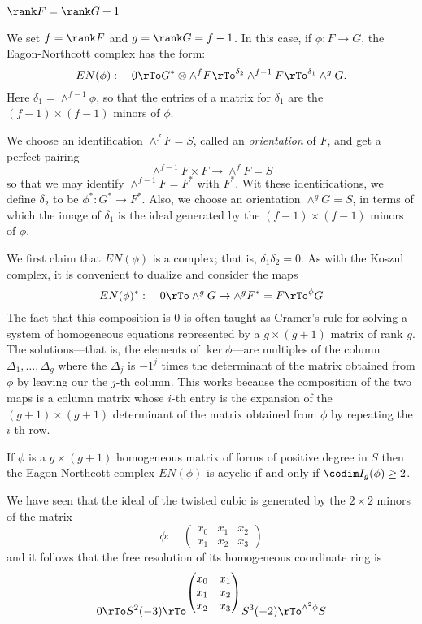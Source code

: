 \subsubsection{ $\rank F = \rank G + 1$}

We set $f = \rank F$ and $g=\rank G = f-1$. In this case, if $\phi:F\to G$, the Eagon-Northcott complex has the form:
$$
EN(\phi):\quad 0\rTo G^{*}\otimes \wedge^{f}F \rTo^{\delta_{2}} \wedge^{f-1}F \rTo^{\delta_{1}} \wedge^gG.
$$
Here $\delta_{1} = \wedge^{f-1}\phi$, so that the entries of a matrix for $\delta_{1}$ are the $(f-1)\times (f-1)$ minors of 
$\phi$.

We choose an identification $\wedge^{f}F = S$, called an \emph{orientation} of $F$, and get a perfect pairing 
$$
\wedge^{f-1}F \times F \to \wedge^{f}F = S
$$
so that we may identify
 $\wedge^{f-1}F = F^{*}$
 with $F^{*}$. Wit these identifications, we define $\delta_{2}$ to be  $\phi^{*}: G^{*}\to F^{*}$. Also,
 we choose an orientation $\wedge^{g}G = S$, in terms of which the image of $\delta_{1}$ is
 the ideal generated by the $(f-1)\times (f-1)$  minors of $\phi$.
 
We first claim that $EN(\phi)$ is a complex; that is,  $\delta_{1}\delta_{2} = 0$.  As with the Koszul complex,
it is convenient to dualize and consider the maps 
$$
EN(\phi)^{*}:\quad 0\rTo \wedge^{g} G \to \wedge^{g}F^{*} = F \rTo^{\phi} G
$$
The fact that this composition is 0 is often taught as Cramer's rule for solving a system of
homogeneous equations represented by a $g\times (g+1)$ matrix of rank $g$.
The solutions---that is, the elements of $\ker \phi$---are multiples of the column
$\Delta_{1}, \dots, \Delta_{g}$ where the $\Delta_{j}$ is $-1^{j}$ times the determinant
of the matrix obtained from $\phi$ by leaving our the $j$-th column. This works
because the composition of the two maps is a column matrix whose $i$-th entry is the
expansion of the $(g+1)\times (g+1)$ determinant of the matrix obtained from $\phi$ by
repeating the $i$-th row.

\begin{theorem}
If $\phi$ is a $g\times (g+1)$ homogeneous matrix of forms of positive degree in $S$ then the Eagon-Northcott
complex $EN(\phi)$ is acyclic if and only if $\codim I_{g}(\phi) \geq 2$.
\end{theorem}

\begin{example}
We have seen that the ideal of the twisted cubic is generated by the $2\times 2$ minors of the matrix
$$
\phi: \quad 
\begin{pmatrix}
 x_{0}&x_{1}&x_{2}\\
 x_{1}&x_{2}&x_{3}
\end{pmatrix}
$$
and it follows that the free resolution of its homogeneous coordinate ring is
$$
0\rTo S^{2}(-3) 
\rTo^{\begin{pmatrix}
 x_{0}&x_{1}\\
  x_{1}&x_{2}\\
x_{2}&x_{3}
\end{pmatrix}
}
S^{3}(-2)
\rTo^{\wedge^{2}\phi}
S
$$
\end{example}

